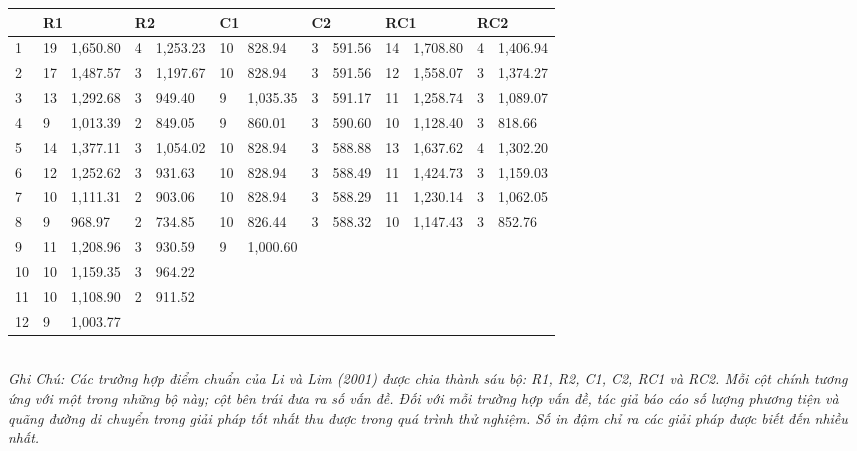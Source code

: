 \begin{table}[caption={Best Results, 100 Locations}, label=tab:2]
    \begin{tabular}{lllllllllllll}
        \toprule
        & \multicolumn{2}{l}{R1} & \multicolumn{2}{l}{R2} & \multicolumn{2}{l}{C1} & \multicolumn{2}{l}{C2} & \multicolumn{2}{l}{RC1} & \multicolumn{2}{l}{RC2} \\
        \midrule
        1  & 19 & 1,650.80 & 4  & 1,253.23 & 10 & 828.94   & 3 & 591.56 & 14 & 1,708.80 & 4 & 1,406.94 \\
        2  & 17 & 1,487.57 & 3  & 1,197.67 & 10 & 828.94   & 3 & 591.56 & 12 & 1,558.07 & 3 & 1,374.27 \\
        3  & 13 & 1,292.68 & 3  & 949.40   & 9  & 1,035.35 & 3 & 591.17 & 11 & 1,258.74 & 3 & 1,089.07 \\
        4  & 9  & 1,013.39 & 2  & 849.05   & 9  & 860.01   & 3 & 590.60 & 10 & 1,128.40 & 3 & 818.66   \\
        5  & 14 & 1,377.11 & 3  & 1,054.02 & 10 & 828.94   & 3 & 588.88 & 13 & 1,637.62 & 4 & 1,302.20 \\
        6  & 12 & 1,252.62 & 3  & 931.63   & 10 & 828.94   & 3 & 588.49 & 11 & 1,424.73 & 3 & 1,159.03 \\
        7  & 10 & 1,111.31 & 2  & 903.06   & 10 & 828.94   & 3 & 588.29 & 11 & 1,230.14 & 3 & 1,062.05 \\
        8  & 9  & 968.97   & 2 & 734.85   & 10 & 826.44   & 3 & 588.32 & 10 & 1,147.43 & 3 & 852.76   \\
        9  & 11 & 1,208.96 & 3  & 930.59   & 9  & 1,000.60 &   &        &    &          &   &          \\
        10 & 10 & 1,159.35 & 3  & 964.22   &    &          &   &        &    &          &   &          \\
        11 & 10 & 1,108.90 & 2  & 911.52   &    &          &   &        &    &          &   &          \\
        12 & 9  & 1,003.77 &    &          &    &          &   &        &    &          &   &          \\
    \end{tabular} \\
    \justify
    \textit{Ghi Chú: Các trường hợp điểm chuẩn của Li và Lim (2001) được chia thành sáu bộ: R1, R2, C1, C2, RC1 và RC2. Mỗi cột chính tương ứng với một trong những bộ này; cột bên trái đưa ra số vấn đề. Đối với mỗi trường hợp vấn đề, tác giả báo cáo số lượng phương tiện và quãng đường di chuyển trong giải pháp tốt nhất thu được trong quá trình thử nghiệm. Số in đậm chỉ ra các giải pháp được biết đến nhiều nhất.}
\end{table}

